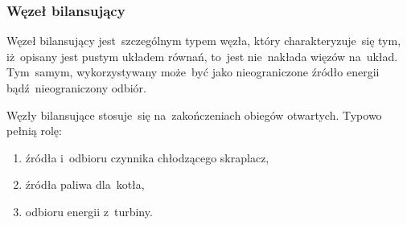 \subsubsection{Węzeł bilansujący}

Węzeł bilansujący jest~szczególnym typem węzła, który charakteryzuje~się
tym, iż~opisany jest pustym układem równań, to~jest nie~nakłada więzów
na~układ. Tym~samym, wykorzystywany może~być jako nieograniczone źródło
energii bądź~nieograniczony odbiór.

Węzły bilansujące stosuje~się na~zakończeniach obiegów otwartych. Typowo
pełnią rolę:

\begin{enumerate}

	\item źródła i~odbioru czynnika chłodzącego skraplacz,

	\item źródła paliwa dla~kotła,

	\item odbioru energii z~turbiny.

\end{enumerate}
